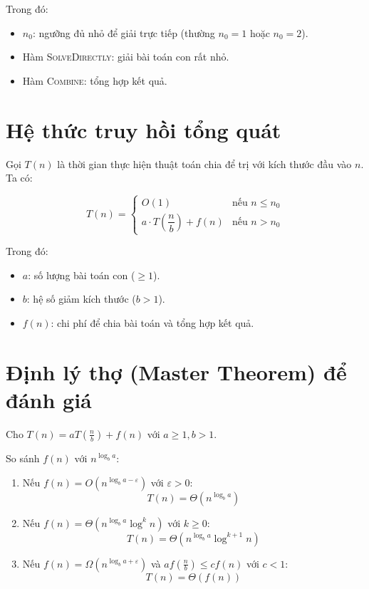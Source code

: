 \documentclass{article}
\begin{document}
Trong đó:
\begin{itemize}
    \item \(n_0\): ngưỡng đủ nhỏ để giải trực tiếp (thường \(n_0 = 1\) hoặc \(n_0 = 2\)).
    \item Hàm \textsc{SolveDirectly}: giải bài toán con rất nhỏ.
    \item Hàm \textsc{Combine}: tổng hợp kết quả.
\end{itemize}

\section{Hệ thức truy hồi tổng quát}

Gọi \(T(n)\) là thời gian thực hiện thuật toán chia để trị với kích thước đầu vào \(n\). Ta có:

\[
T(n) = 
\begin{cases}
O(1) & \text{nếu } n \le n_0 \\
a \cdot T\left(\dfrac{n}{b}\right) + f(n) & \text{nếu } n > n_0
\end{cases}
\]

Trong đó:
\begin{itemize}
    \item \(a\): số lượng bài toán con (\(\ge 1\)).
    \item \(b\): hệ số giảm kích thước (\(b > 1\)).
    \item \(f(n)\): chi phí để chia bài toán và tổng hợp kết quả.
\end{itemize}

\section{Định lý thợ (Master Theorem) để đánh giá}

Cho \(T(n) = aT\left(\frac{n}{b}\right) + f(n)\) với \(a \ge 1, b > 1\).

So sánh \(f(n)\) với \(n^{\log_b a}\):

\begin{enumerate}
    \item Nếu \(f(n) = O(n^{\log_b a - \varepsilon})\) với \(\varepsilon > 0\):  
    \[
    T(n) = \Theta(n^{\log_b a})
    \]
    \item Nếu \(f(n) = \Theta(n^{\log_b a} \log^k n)\) với \(k \ge 0\):  
    \[
    T(n) = \Theta(n^{\log_b a} \log^{k+1} n)
    \]
    \item Nếu \(f(n) = \Omega(n^{\log_b a + \varepsilon})\) và \(a f\left(\frac{n}{b}\right) \le c f(n)\) với \(c < 1\):  
    \[
    T(n) = \Theta(f(n))
    \]
\end{enumerate}
\end{document}
